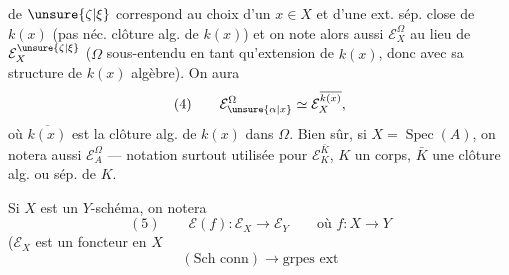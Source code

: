 de $\unsure{\zeta|\xi}$ correspond au choix d'un $x\in X$ et d'une ext. sép. close  \inserted{$\Omega$} de $k(x)$ (pas néc.  clôture alg. de $k(x)$) et on note alors aussi $\mathcal E_X^\Omega$ au lieu de $\mathcal E_X^{\unsure{\zeta|\xi}}$ ($\Omega$ sous-entendu en tant qu'extension de $k(x)$, donc avec sa structure de $k(x)$ algèbre). On aura 
\[
(4)\qquad \mathcal E_{\unsure{\alpha|x}}^\Omega\simeq\mathcal E_X^{\overline{k(x)}},
\]
où $\overline{k(x)}$ est la clôture alg. de $k(x)$ dans $\Omega$. Bien sûr, si $X=\operatorname{Spec}(A)$, on notera aussi $\mathcal E_A^\Omega$ --- notation surtout utilisée pour $\mathcal E_K^{\bar K}$, $K$ un corps, $\bar K$ une clôture alg. ou sép. de $K$.

Si $X$ est un $Y$-schéma,  on notera
\[
(5)\qquad \mathcal E(f):\mathcal E_X\longrightarrow\mathcal E_Y\qquad\text{où }f:X\longrightarrow Y
\]
($\mathcal E_X$ est un foncteur en $X$
\[
(\text{Sch conn})\longrightarrow\text{grpes ext}
\]
